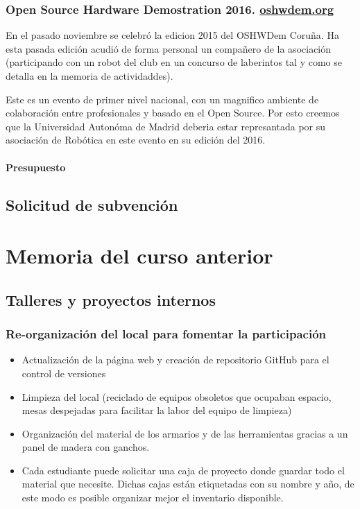\documentclass[12pt,twoside]{report}
\begin{document}
\subsection{Open Source Hardware Demostration 2016. \url{oshwdem.org}}
En el pasado noviembre se celebró la edicion 2015 del OSHWDem Coruña. Ha esta pasada edición acudió de forma personal un compañero de la asociación (participando con un robot del club en un concurso de laberintos tal y como se detalla en la memoria de actividaddes).

Este es un evento de primer nivel nacional, con un magnifico ambiente de colaboración entre profesionales y basado en el Open Source. Por esto creemos que la Universidad Autonóma de Madrid deberia estar represantada por su asociación de Robótica en este evento en su edición del 2016.

\subsubsection{Presupuesto}

\section{Solicitud de subvención}





\chapter{Memoria del curso anterior}

\section{Talleres y proyectos internos}

\subsection{Re-organización del local para fomentar la participación}

\begin{itemize}
\item Actualización de la página web y creación de repositorio GitHub para el control de versiones
\item Limpieza del local (reciclado de equipos obsoletos que ocupaban espacio, mesas despejadas para facilitar la labor del equipo de limpieza)
\item Organización del material de los armarios y de las herramientas gracias a un panel de madera con ganchos.
\item Cada estudiante puede solicitar una caja de proyecto donde guardar todo el material que necesite. Dichas cajas están etiquetadas con su nombre y año, de este modo es posible organizar mejor el inventario disponible.
\end{itemize}
\end{document}
